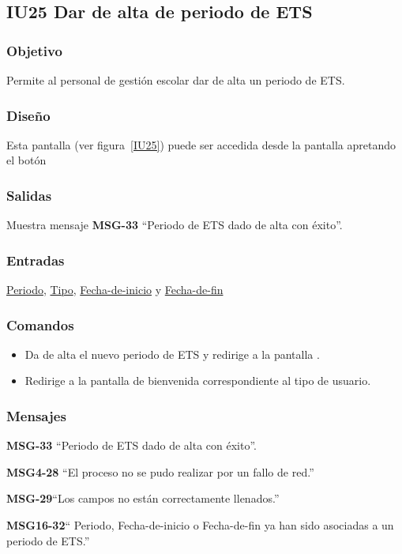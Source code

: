 
\subsection{IU25 Dar de alta de periodo de ETS}
\subsubsection{Objetivo}
    Permite al personal de gestión escolar dar de alta un periodo de ETS.
\subsubsection{Diseño}
    Esta pantalla  (ver figura~\ref{IU25}) puede ser accedida desde la pantalla  apretando el botón 

\subsubsection{Salidas}
Muestra mensaje {\bf MSG-33} ``Periodo de ETS  dado de alta con éxito''.
\subsubsection{Entradas}
\hyperlink{Periodo de ETS.Periodo}{Periodo}, \hyperlink{Periodo-de-ETS.Tipo}{Tipo}, \hyperlink{Periodo-de-ETS.Fecha-de-inicio}{Fecha-de-inicio} y \hyperlink{Periodo-de-ETS.Fecha-de-fin}{Fecha-de-fin}
\subsubsection{Comandos}
\begin{itemize}
    \item {} Da de alta el nuevo periodo de ETS y redirige a la pantalla .
    \item {} Redirige a la pantalla de bienvenida correspondiente al tipo de usuario.
    
\end{itemize}

\subsubsection{Mensajes}

\begin{Citemize}
    \item {\bf MSG-33} ``Periodo de ETS  dado de alta con éxito''.
    \item {\bf MSG4-28}  ``El proceso no se pudo realizar por un fallo de red.''
    \item {\bf MSG-29}{``Los campos no están correctamente llenados.''}
    \item {\bf MSG16-32}{`` Periodo, Fecha-de-inicio o Fecha-de-fin ya han sido asociadas a un periodo de ETS.''}
\end{Citemize}

